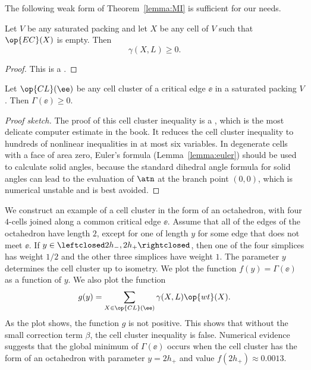 The following weak form of Theorem~\ref{lemma:MI} is sufficient
for our needs.

\begin{lemma}\label{lemma:LI} 
Let $V$ be any saturated packing and let $X$ be any cell of $V$ such that $\op{EC}(X)$ is empty.   Then
\[
\gamma(X,L)\ge 0.
\]
\end{lemma}

\begin{proof} This is a .
\end{proof}


\begin{theorem} 
\label{lemma:cluster}
Let $\op{CL}(\ee)$ be any cell cluster of a critical edge $\ee$ in a
saturated packing $V$.  Then $\Gamma(\ee)\ge 0$.
\end{theorem}

\begin{proof}[Proof sketch]
  The proof of this cell cluster inequality is a , which
  is the most delicate computer estimate in the book.  It 
  reduces the cell cluster inequality to hundreds of nonlinear
  inequalities in at most six variables.  In degenerate cells with a
  face of area zero, Euler's formula (Lemma~\ref{lemma:euler}) should
  be used to calculate solid angles, because the standard dihedral angle
  formula for solid angles can lead to the evaluation of $\atn$ at the
  branch point $(0,0)$, which is numerical unstable and is best
  avoided.
\end{proof}

\begin{example}
  We  construct an example of a cell cluster in the form of an
  octahedron, with four $4$-cells joined along a common critical edge
  $\ee$.  Assume that all of the edges of the octahedron have length
  $2$, except for one of length $y$ for some edge that does not meet
  $\ee$.  If $y\in \leftclosed 2 h_-,2 h_+\rightclosed$, then one of
  the four simplices has weight $1/2$ and the other three simplices
  have weight $1$.  The parameter $y$ determines the cell cluster up
  to isometry.  We plot the function $f(y)=\Gamma(\ee)$
  as a function of $y$.    We also plot the function
\[
g(y) = \sum_{X\in \op{CL}(\ee)} \gamma(X,L) \op{wt}(X).
\]
As the plot shows, the function $g$ is not positive.  This shows
that without the small correction term $\beta$, the cell cluster
inequality is false.  Numerical evidence suggests that the global
minimum of $\Gamma(\ee)$ occurs when the cell cluster has
the form of an octahedron with parameter $y=2h_+$ and value
$f(2h_+)\approx 0.0013$.
\end{example}
%

